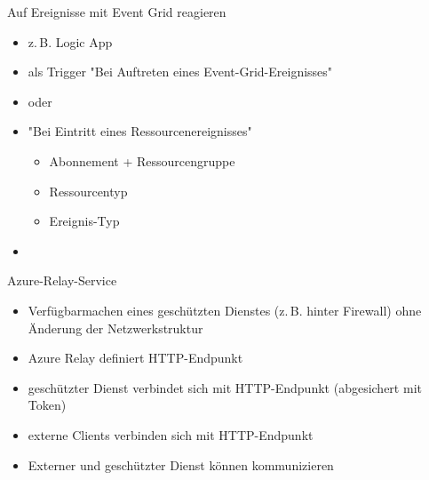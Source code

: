 \begin{flashcard}[Definition]{Auf Ereignisse mit Event Grid reagieren}
    \begin{itemize}
        \item z.\,B. Logic App
        \item als Trigger "Bei Auftreten eines Event-Grid-Ereignisses"
        \item[] oder
        \item "Bei Eintritt eines Ressourcenereignisses"
            \begin{itemize}
                \item Abonnement + Ressourcengruppe
                \item Ressourcentyp
                \item Ereignis-Typ
            \end{itemize}
    \end{itemize}
\end{flashcard}

\begin{flashcard}[Definition]{}
    \begin{itemize}
        \item
    \end{itemize}
\end{flashcard}

\begin{flashcard}[Definition]{Azure-Relay-Service}
    \begin{itemize}
        \item Verfügbarmachen eines geschützten Dienstes (z.\,B. hinter Firewall) ohne Änderung der Netzwerkstruktur
        \item Azure Relay definiert HTTP-Endpunkt
        \item geschützter Dienst verbindet sich mit HTTP-Endpunkt (abgesichert mit Token)
        \item externe Clients verbinden sich mit HTTP-Endpunkt
        \item[$\Rightarrow$] Externer und geschützter Dienst können kommunizieren
    \end{itemize}
\end{flashcard}


